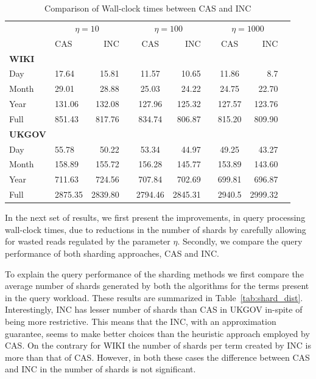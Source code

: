 \begin{table}\centering
\begin{tabular}{@{}llrrcrrcrr@{}}\toprule
& \multicolumn{2}{c}{\textbf{$\eta=10$}} & \phantom{ab} & \multicolumn{2}{c}{\textbf{$\eta=100$}}& \phantom{ab} & \multicolumn{2}{c}{\textbf{$\eta=1000$}}\\ 
\cmidrule{2-3} \cmidrule{5-6} \cmidrule{8-9}
 & CAS & INC && CAS & INC && CAS & INC\\ \midrule
\textbf{WIKI}\\
 Day & 17.64 & 15.81 && 11.57 & 10.65 && 11.86 & 8.7\\
 Month & 29.01 & 28.88 && 25.03 & 24.22 && 24.75 & 22.70\\
 Year & 131.06 & 132.08 && 127.96 & 125.32 && 127.57 & 123.76\\ 
 Full & 851.43 & 817.76 && 834.74 & 806.87 && 815.20 & 809.90\\
\midrule
\textbf{UKGOV}\\
 Day  & 55.78 & 50.22 && 53.34 & 44.97 && 49.25 & 43.27\\
 Month & 158.89 & 155.72 && 156.28 & 145.77 && 153.89 & 143.60\\
 Year  & 711.63 & 724.56 && 707.84 & 702.69 && 699.81 & 696.87 \\ 
 Full  & 2875.35 & 2839.80 && 2794.46 & 2845.31 && 2940.5 & 2999.32 \\
 \bottomrule
\end{tabular}
\caption{Comparison of Wall-clock times between CAS and INC}

\label{tab:sharding_qp}
\end{table}

In the next set of results, we first present the improvements, in query processing wall-clock times, due to reductions in the number of shards by carefully allowing for wasted reads regulated by the parameter $\eta$. Secondly, we compare the query performance of both sharding approaches, CAS and INC. 

To explain the query performance of the sharding methods we first compare the average number of shards generated by both the algorithms for the terms present in the query workload. These results are summarized in Table~\ref{tab:shard_dist}. Interestingly, INC has lesser number of shards than CAS in UKGOV in-spite of being more restrictive. This means that the INC, with an approximation guarantee, seems to make better choices than the heuristic approach employed by CAS. On the contrary for WIKI the number of shards per term created by INC is more than that of CAS. However, in both these cases the difference between CAS and INC in the number of shards is not significant.

